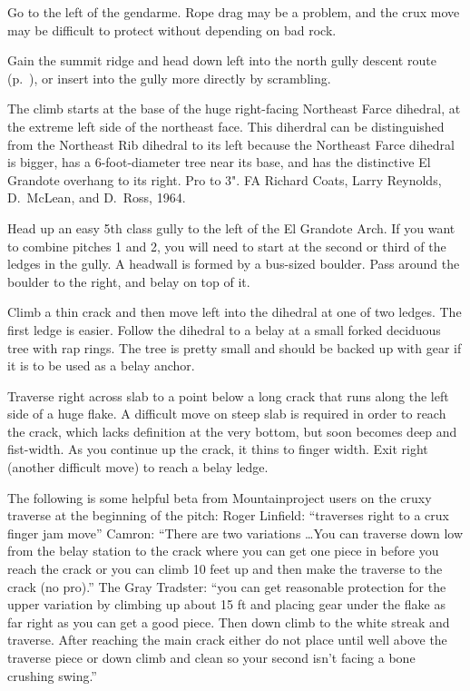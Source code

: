 \documentclass{tahquitz}
\begin{document}
 Go to the left of the gendarme.
Rope drag may be a problem, and the crux move may be difficult to protect
without depending on bad rock.

\somespace

\descent Gain the summit ridge and head down left into the north gully descent route (p.~\pageref{subsec:north-gully-descent}),
or insert into the gully more directly by scrambling.





The climb starts at the base of the huge right-facing Northeast Farce dihedral,
at the extreme left side of the northeast face.
This diherdral can be distinguished from the Northeast Rib dihedral to its left
because the Northeast Farce dihedral is bigger, has a 6-foot-diameter tree near its base,
and has the distinctive El Grandote overhang to its right.
Pro to 3". FA Richard Coats, Larry Reynolds, D.~McLean, and D.~Ross, 1964.

\somespace

 Head up an easy 5th class gully to the left of the El Grandote Arch.
If you want to combine pitches 1 and 2, you will need to start at the second or third
of the ledges in the gully. A headwall is formed by a bus-sized boulder. Pass around the boulder
to the right, and belay on top of it.

 Climb a thin crack and then move left into the dihedral at one of two ledges.
The first ledge is easier. Follow the dihedral to a belay at a small forked deciduous tree with rap
rings. The tree is pretty small and should be backed up with gear if it is to be
used as a belay anchor.

 Traverse right across slab to a point below a long crack that runs
along the left side of a huge flake. A difficult move on steep slab is required in
order to reach the crack, which lacks definition at the very bottom, but soon becomes
deep and fist-width. As you continue up the crack, it thins to finger width.
Exit right (another difficult move) to reach a belay ledge.

The following is some helpful beta from Mountainproject users on the
cruxy traverse at the beginning of the pitch: Roger Linfield: ``traverses right to a
crux finger jam move''  Camron: ``There are two variations
\ldots You can traverse down low from the belay station to the crack
where you can get one piece in before you reach the crack or you can
climb 10 feet up and then make the traverse to the crack (no pro).''
The Gray Tradster: ``you can get reasonable protection for the upper variation
by climbing up about 15 ft and placing gear under the flake as far
right as you can get a good piece. Then down climb to the white streak
and traverse.  After reaching the main crack either do not place until
well above the traverse piece or down climb and clean so your second
isn't facing a bone crushing swing.''
\end{document}
